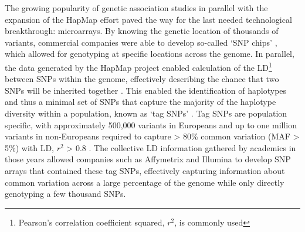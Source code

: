The growing popularity of genetic association studies in parallel with the expansion of the HapMap effort paved the way for the last needed technological breakthrough: microarrays.
By knowing the genetic location of thousands of variants, commercial companies were able to develop so-called `SNP chips' \cite{meaburn2006genotyping, oliphant2002beadarray}, which allowed for genotyping at specific locations across the genome.
In parallel, the data generated by the HapMap project enabled calculation of the LD\footnote{Pearson's correlation coefficient squared, $r^2$, is commonly used} between SNPs within the genome, effectively describing the chance that two SNPs will be inherited together \cite{bush2012genome}.
This enabled the identification of haplotypes and thus a minimal set of SNPs that capture the majority of the haplotype diversity 
within a population, known as `tag SNPs' \cite{international2003international}. 
Tag SNPs are population specific, with approximately 500,000 variants in Europeans and up to one million variants in non-Europeans required to capture > 80\% common variation (MAF > 5\%) with LD, $r^2$ > 0.8 \cite{bush2012genome, visscher2012five}.
The collective LD information gathered by academics in those years \cite{slatkin2008linkage, pe2006evaluating, otto2002resolving} allowed companies such as Affymetrix and Illumina to develop SNP arrays that contained 
these tag SNPs,
effectively capturing information about common variation 
across a large percentage of the genome while only directly genotyping a few thousand SNPs.\\

